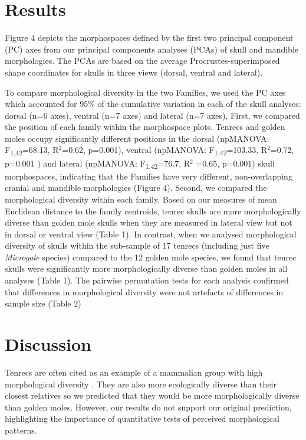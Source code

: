 \documentclass[12pt,a4paper]{article}
\begin{document}
\section{Results} 
	Figure 4 depicts the morphospaces defined by the first two principal component (PC) axes from our principal components analyses (PCAs) of skull and mandible morphologies. The PCAs are based on the average Procrustes-superimposed shape coordinates for skulls in three views (dorsal, ventral and lateral).

	To compare morphological diversity in the two Families, we used the PC axes which accounted for 95\% of the cumulative variation in each of the skull analyses: dorsal (n=6 axes), ventral (n=7 axes) and lateral (n=7 axes). First, we compared the position of each family within the morphospace plots. Tenrecs and golden moles occupy significantly different positions in the dorsal (npMANOVA: F\textsubscript{1,42}=68.13, R$^2$=0.62, p=0.001), ventral (npMANOVA: F\textsubscript{1,42}=103.33, R$^2$=0.72, p=0.001 ) and lateral (npMANOVA: F\textsubscript{1,42}=76.7, R$^2$ =0.65, p=0.001) skull morphospaces, indicating that the Families have very different, non-overlapping cranial and mandible morphologies (Figure 4). 
	Second, we compared the morphological diversity within each family. Based on our measures of mean Euclidean distance to the family centroids, tenrec skulls are more morphologically diverse than golden mole skulls when they are measured in lateral view but not in dorsal or ventral view (Table 1). In contrast, when we analysed morphological diversity of skulls within the sub-sample of 17 tenrecs (including just five \textit{Microgale} species) compared to the 12 golden mole species, we found that tenrec skulls were significantly more morphologically diverse than golden moles in all analyses (Table 1). The pairwise permutation tests for each analysis confirmed that differences in morphological diversity were not artefacts of differences in sample size (Table 2)

\section{Discussion}

	Tenrecs are often cited as an example of a mammalian group with high morphological diversity \citep{Olson2013, Soarimalala2011, Eisenberg1969}. They are also more ecologically diverse than their closest relatives \citep{Soarimalala2011, Bronner1995} so we predicted that they would be more morphologically diverse than golden moles. However, our results do not support our original prediction, highlighting the importance of quantitative tests of perceived morphological patterns.
\end{document}
